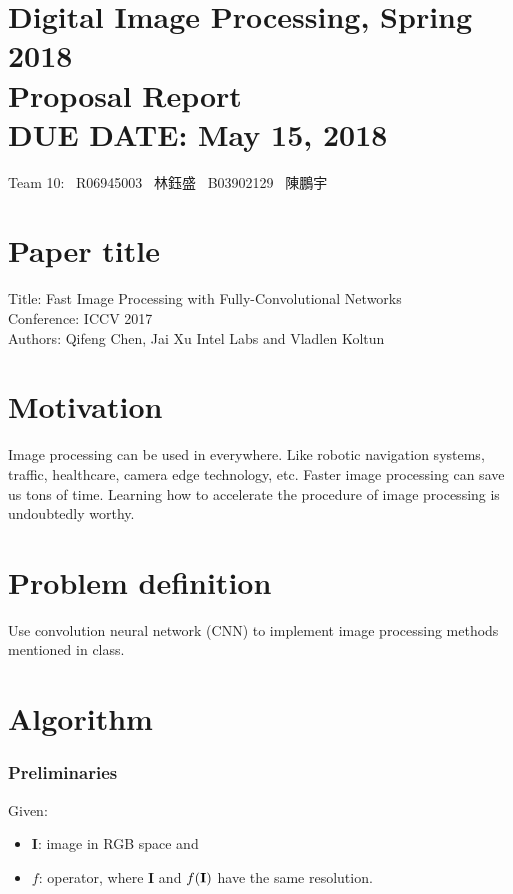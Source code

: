 \documentclass{article}
\newcommand{\hmwkClass}{Digital Image Processing, Spring 2018}
\newcommand{\hmwkTitle}{Proposal Report}
\newcommand{\hmwkDueDate}{May 15, 2018}
\newcommand{\tb}{\textbf}
\begin{document}
\thispagestyle{empty}
\section*{\hmwkClass \\
    \normalsize{\hmwkTitle} \\
    \normalsize{DUE DATE: \hmwkDueDate}
}

\hfill{Team 10: \, R06945003 \, 林鈺盛 \, B03902129 \, 陳鵬宇} \\

\section*{Paper title}

Title: Fast Image Processing with Fully-Convolutional Networks \\
Conference: ICCV 2017 \\
Authors: Qifeng Chen, Jai Xu Intel Labs and Vladlen Koltun

\section*{Motivation}

Image processing can be used in everywhere. Like robotic navigation systems, traffic, healthcare, camera edge technology, etc. Faster image processing can save us tons of time. Learning how to accelerate the procedure of image processing is undoubtedly worthy.

\section*{Problem definition}

Use convolution neural network (CNN) to implement image processing methods mentioned in class.

\section*{Algorithm}

\subsubsection*{Preliminaries}

Given:

\begin{itemize}
    \item \tb I: image in RGB space and
    \item $f$: operator, where \tb{I} and $f(\tb I)$ have the same resolution.
\end{itemize}
\end{document}
